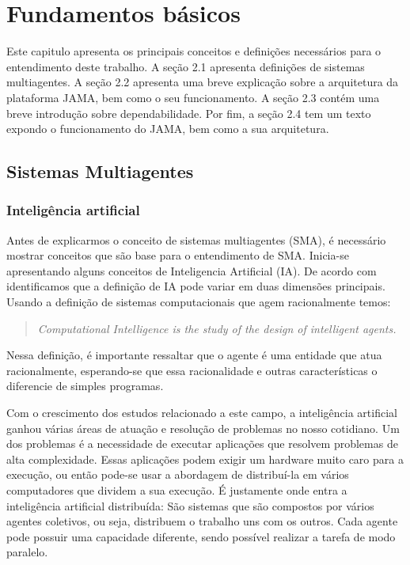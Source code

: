 \chapter{Fundamentos básicos}

Este capitulo apresenta os principais conceitos e definições necessários para o entendimento deste trabalho. A seção 2.1 apresenta definições de sistemas multiagentes.
A seção 2.2 apresenta uma breve explicação sobre a arquitetura da plataforma JAMA, bem como o seu funcionamento.
A seção 2.3 contém uma breve introdução sobre dependabilidade.
Por fim, a seção 2.4 tem um texto expondo o funcionamento do JAMA, bem como a sua arquitetura.

\section{Sistemas Multiagentes}

\subsection{Inteligência artificial}

Antes de explicarmos o conceito de sistemas multiagentes (SMA), é necessário mostrar conceitos que são base para o entendimento de SMA. Inicia-se apresentando alguns conceitos de Inteligencia Artificial (IA). De acordo com~\cite{poole98} identificamos que a definição de IA pode variar em duas dimensões principais. Usando a definição de sistemas computacionais que agem racionalmente temos:

\begin{quote}
\emph{Computational Intelligence is the study of the design of intelligent agents.}
\end{quote}

Nessa definição, é importante ressaltar que o agente é uma entidade que atua racionalmente, esperando-se que essa racionalidade e outras características o diferencie de simples programas.

Com o crescimento dos estudos relacionado a este campo, a inteligência artificial ganhou várias áreas de atuação e resolução de problemas no nosso cotidiano. Um dos problemas é a necessidade de executar aplicações que resolvem problemas de alta complexidade. Essas aplicações podem exigir um hardware muito caro para a execução, ou então pode-se usar a abordagem de distribuí-la em vários computadores que dividem a sua execução. É justamente onde entra a inteligência artificial distribuída: São sistemas que são compostos por vários agentes coletivos, ou seja, distribuem o trabalho uns com os outros. Cada agente pode possuir uma capacidade diferente, sendo possível realizar a tarefa de modo paralelo. 

